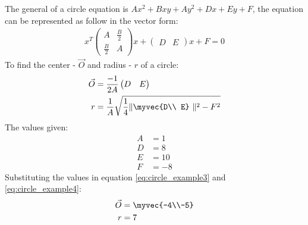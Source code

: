 \solution The general of a circle equation is $Ax^2 + Bxy + Ay^2 + Dx + Ey + F$, the equation can be represented as follow in the vector form:
\begin{align}
x^T 
\begin{pmatrix}
A & \frac{B}{2} \\
\frac{B}{2} & A
\end{pmatrix}
x + 
\begin{pmatrix}
D & E 
\end{pmatrix}
x + F = 0
\end{align}
To find the center - $\vec{O}$ and radius - $r$ of a circle:
\begin{align}
\vec{O} &= \frac{-1}{2A}\begin{pmatrix}
D & E 
\end{pmatrix}\label{eq:circle_example3}\\
r &= \frac{1}{A}\sqrt{ \frac{1}{4} \| \myvec{D\\ E}\ \|^2 - F^2}\label{eq:circle_example4}
\end{align}
The values given:
\begin{align}
A &= 1\\
D &= 8 \\
E &= 10 \\
F &= -8
\end{align}
Substituting the values in equation \ref{eq:circle_example3} and \ref{eq:circle_example4}:
\begin{align}
\vec{O} &= \myvec{-4\\-5}\\
r &= 7
\end{align} 